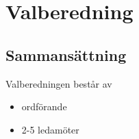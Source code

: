 \section{Valberedning}
 
\subsection{Sammansättning}
Valberedningen består av
\begin{itemize}
	\item ordförande
	\item 2-5 ledamöter
\end{itemize}
